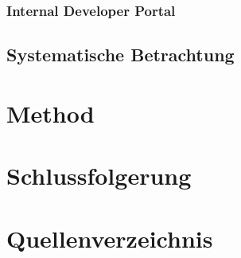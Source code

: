 \documentclass[a4paper,12pt]{article}
\begin{document}
    \subsubsection{Internal Developer Portal}

    \subsection{Systematische Betrachtung}


    \section{Method}
    \section{Schlussfolgerung}
    \pagebreak

    \section{Quellenverzeichnis}

    \printbibliography[heading=none]
\end{document}
